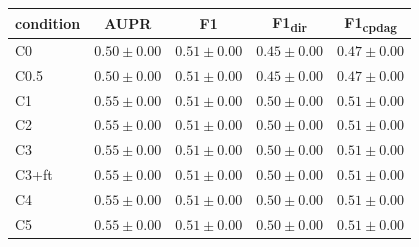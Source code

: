 \begin{tabular}{lcccc}
\hline
condition & AUPR & F1 & F1\textsubscript{dir} & F1\textsubscript{cpdag} \\
\hline
C0 & $0.50 \pm 0.00$ & $0.51 \pm 0.00$ & $0.45 \pm 0.00$ & $0.47 \pm 0.00$ \\
C0.5 & $0.50 \pm 0.00$ & $0.51 \pm 0.00$ & $0.45 \pm 0.00$ & $0.47 \pm 0.00$ \\
C1 & $0.55 \pm 0.00$ & $0.51 \pm 0.00$ & $0.50 \pm 0.00$ & $0.51 \pm 0.00$ \\
C2 & $0.55 \pm 0.00$ & $0.51 \pm 0.00$ & $0.50 \pm 0.00$ & $0.51 \pm 0.00$ \\
C3 & $0.55 \pm 0.00$ & $0.51 \pm 0.00$ & $0.50 \pm 0.00$ & $0.51 \pm 0.00$ \\
C3+ft & $0.55 \pm 0.00$ & $0.51 \pm 0.00$ & $0.50 \pm 0.00$ & $0.51 \pm 0.00$ \\
C4 & $0.55 \pm 0.00$ & $0.51 \pm 0.00$ & $0.50 \pm 0.00$ & $0.51 \pm 0.00$ \\
C5 & $0.55 \pm 0.00$ & $0.51 \pm 0.00$ & $0.50 \pm 0.00$ & $0.51 \pm 0.00$ \\
\hline
\end{tabular}
